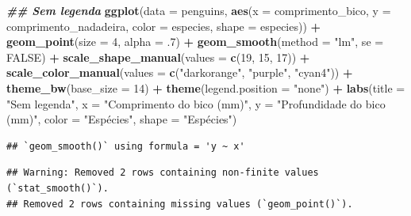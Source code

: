 \documentclass[
]{article}
\newenvironment{Shaded}{\begin{snugshade}}{\end{snugshade}}
\newcommand{\AttributeTok}[1]{\textcolor[rgb]{0.13,0.29,0.53}{#1}}
\newcommand{\ConstantTok}[1]{\textcolor[rgb]{0.56,0.35,0.01}{#1}}
\newcommand{\DecValTok}[1]{\textcolor[rgb]{0.00,0.00,0.81}{#1}}
\newcommand{\DocumentationTok}[1]{\textcolor[rgb]{0.56,0.35,0.01}{\textbf{\textit{#1}}}}
\newcommand{\FunctionTok}[1]{\textcolor[rgb]{0.13,0.29,0.53}{\textbf{#1}}}
\newcommand{\NormalTok}[1]{#1}
\newcommand{\SpecialCharTok}[1]{\textcolor[rgb]{0.81,0.36,0.00}{\textbf{#1}}}
\newcommand{\StringTok}[1]{\textcolor[rgb]{0.31,0.60,0.02}{#1}}
\begin{document}
\begin{Shaded}
\begin{Highlighting}[]
\DocumentationTok{\#\# Sem legenda}
\FunctionTok{ggplot}\NormalTok{(}\AttributeTok{data =}\NormalTok{ penguins, }
       \FunctionTok{aes}\NormalTok{(}\AttributeTok{x =}\NormalTok{ comprimento\_bico,  }\AttributeTok{y =}\NormalTok{ comprimento\_nadadeira,}
           \AttributeTok{color =}\NormalTok{ especies, }\AttributeTok{shape =}\NormalTok{ especies)) }\SpecialCharTok{+}
    \FunctionTok{geom\_point}\NormalTok{(}\AttributeTok{size =} \DecValTok{4}\NormalTok{, }\AttributeTok{alpha =}\NormalTok{ .}\DecValTok{7}\NormalTok{) }\SpecialCharTok{+}
    \FunctionTok{geom\_smooth}\NormalTok{(}\AttributeTok{method =} \StringTok{"lm"}\NormalTok{, }\AttributeTok{se =} \ConstantTok{FALSE}\NormalTok{) }\SpecialCharTok{+}
    \FunctionTok{scale\_shape\_manual}\NormalTok{(}\AttributeTok{values =} \FunctionTok{c}\NormalTok{(}\DecValTok{19}\NormalTok{, }\DecValTok{15}\NormalTok{, }\DecValTok{17}\NormalTok{)) }\SpecialCharTok{+}
    \FunctionTok{scale\_color\_manual}\NormalTok{(}\AttributeTok{values =} \FunctionTok{c}\NormalTok{(}\StringTok{"darkorange"}\NormalTok{, }\StringTok{"purple"}\NormalTok{, }\StringTok{"cyan4"}\NormalTok{)) }\SpecialCharTok{+}
    \FunctionTok{theme\_bw}\NormalTok{(}\AttributeTok{base\_size =} \DecValTok{14}\NormalTok{) }\SpecialCharTok{+}
    \FunctionTok{theme}\NormalTok{(}\AttributeTok{legend.position =} \StringTok{"none"}\NormalTok{) }\SpecialCharTok{+}
    \FunctionTok{labs}\NormalTok{(}\AttributeTok{title =} \StringTok{"Sem legenda"}\NormalTok{, }\AttributeTok{x =} \StringTok{"Comprimento do bico (mm)"}\NormalTok{, }
         \AttributeTok{y =} \StringTok{"Profundidade do bico (mm)"}\NormalTok{, }\AttributeTok{color =} \StringTok{"Espécies"}\NormalTok{, }\AttributeTok{shape =} \StringTok{"Espécies"}\NormalTok{)}
\end{Highlighting}
\end{Shaded}

\begin{verbatim}
## `geom_smooth()` using formula = 'y ~ x'
\end{verbatim}

\begin{verbatim}
## Warning: Removed 2 rows containing non-finite values (`stat_smooth()`).
## Removed 2 rows containing missing values (`geom_point()`).
\end{verbatim}
\end{document}
